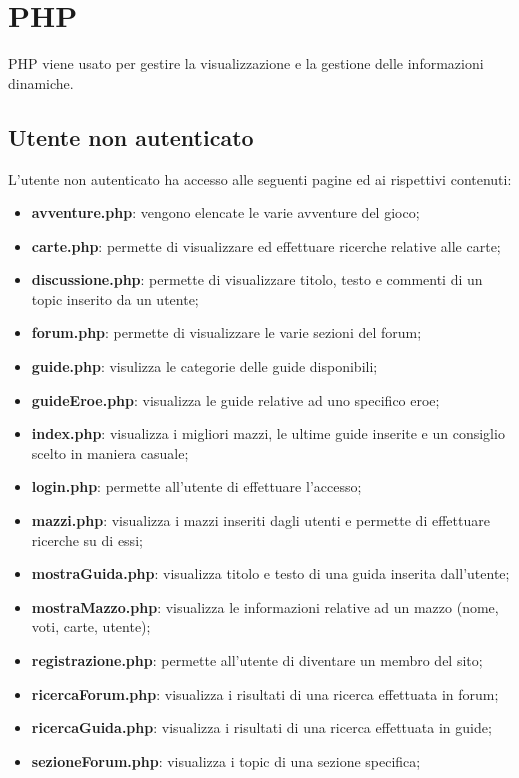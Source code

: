 \section{PHP}
PHP viene usato per gestire la visualizzazione e la gestione delle informazioni dinamiche.
\subsection{Utente non autenticato}
L'utente non autenticato ha accesso alle seguenti pagine ed ai rispettivi contenuti:
\begin{itemize}
	\item \textbf{avventure.php}: vengono elencate le varie avventure del gioco;
	\item \textbf{carte.php}: permette di visualizzare ed effettuare ricerche relative alle carte;
	\item \textbf{discussione.php}: permette di visualizzare titolo, testo e commenti di un topic inserito da un utente;
	\item \textbf{forum.php}: permette di visualizzare le varie sezioni del forum;
	\item \textbf{guide.php}: visulizza le categorie delle guide disponibili;
	\item \textbf{guideEroe.php}: visualizza le guide relative ad uno specifico eroe;
	\item \textbf{index.php}: visualizza i migliori mazzi, le ultime guide inserite e un consiglio scelto in maniera casuale;
	\item \textbf{login.php}: permette all'utente di effettuare l'accesso;
	\item \textbf{mazzi.php}: visualizza i mazzi inseriti dagli utenti e permette di effettuare ricerche su di essi;
	\item \textbf{mostraGuida.php}: visualizza titolo e testo di una guida inserita dall'utente;
	\item \textbf{mostraMazzo.php}: visualizza le informazioni relative ad un mazzo (nome, voti, carte, utente);
	\item \textbf{registrazione.php}: permette all'utente di diventare un membro del sito;
	\item \textbf{ricercaForum.php}: visualizza i risultati di una ricerca effettuata in forum;
	\item \textbf{ricercaGuida.php}: visualizza i risultati di una ricerca effettuata in guide;
	\item \textbf{sezioneForum.php}: visualizza i topic di una sezione specifica;
\end{itemize}
